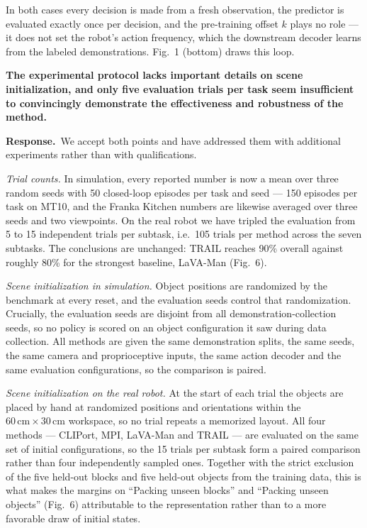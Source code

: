 \documentclass[11pt,a4paper]{article}
\newcommand{\C}[1]{\textbf{#1}\par\vspace{2pt}}
\newcommand{\R}[1]{\textbf{Response.}~#1}
\begin{document}
\begin{qa}
{In both cases every decision is made from a fresh observation, the predictor is
evaluated exactly once per decision, and the pre-training offset $k$ plays no role --- it does not
set the robot's action frequency, which the downstream decoder learns from the labeled
demonstrations. Fig.~1 (bottom) draws this loop.}

\item \C{The experimental protocol lacks important details on scene initialization, and only five
evaluation trials per task seem insufficient to convincingly demonstrate the effectiveness and
robustness of the method.}
\R{We accept both points and have addressed them with additional experiments rather than with
qualifications.

\emph{Trial counts.} In simulation, every reported number is now a mean over three random seeds
with 50 closed-loop episodes per task and seed --- 150 episodes per task on MT10, and the Franka
Kitchen numbers are likewise averaged over three seeds and two viewpoints. On the real robot we
have tripled the evaluation from 5 to 15 independent trials per subtask, i.e.\ 105 trials per
method across the seven subtasks. The conclusions are unchanged: TRAIL reaches 90\% overall against
roughly 80\% for the strongest baseline, LaVA-Man (Fig.~6).

\emph{Scene initialization in simulation.} Object positions are randomized by the benchmark at
every reset, and the evaluation seeds control that randomization. Crucially, the evaluation seeds
are disjoint from all demonstration-collection seeds, so no policy is scored on an object
configuration it saw during data collection. All methods are given the same demonstration splits,
the same seeds, the same camera and proprioceptive inputs, the same action decoder and the same
evaluation configurations, so the comparison is paired.

\emph{Scene initialization on the real robot.} At the start of each trial the objects are placed by
hand at randomized positions and orientations within the $60\,\mathrm{cm}\times30\,\mathrm{cm}$
workspace, so no trial repeats a memorized layout. All four methods --- CLIPort, MPI, LaVA-Man and
TRAIL --- are evaluated on the same set of initial configurations, so the 15 trials per subtask
form a paired comparison rather than four independently sampled ones. Together with the strict
exclusion of the five held-out blocks and five held-out objects from the training data, this is
what makes the margins on ``Packing unseen blocks'' and ``Packing unseen objects'' (Fig.~6)
attributable to the representation rather than to a more favorable draw of initial states.}


\end{qa}
\end{document}

